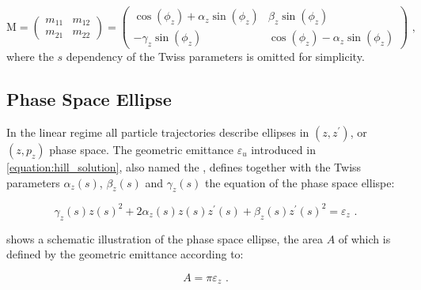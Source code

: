 \begin{equation}
    \mathrm{M} = 
    \left( 
    \begin{array}{ll}
        m_{11} & m_{12} \\
        m_{21} & m_{22}
    \end{array} \right) 
    = 
    \left(
    \begin{array}{cc}
        \cos \left( \phi_z \right) + \alpha_z \sin \left( \phi_z \right) & \beta_z \sin \left( \phi_z \right) \\
        - \gamma_z \sin \left( \phi_z \right)                            & \cos \left( \phi_z \right) - \alpha_z \sin \left( \phi_z \right)
    \end{array} 
    \right) \text{ ,}
    \label{equation:transfer_matrix_twiss_parameters}
\end{equation}
where the \(s\) dependency of the Twiss parameters is omitted for simplicity.

\subsection{Phase Space Ellipse}
\label{subsection:phase_space_ellipse}

In the linear regime all particle trajectories describe ellipses in \((z, z^{\prime})\), or \((z, p_z)\) phase space.
The geometric emittance \(\varepsilon_u\) introduced in \cref{equation:hill_solution}, also named the , defines together with the Twiss parameters \(\alpha_z(s)\), \(\beta_z(s)\) and \(\gamma_z(s)\) the equation of the phase space ellispe:

\begin{equation}
    \gamma_z(s) z(s)^{2} + 2 \alpha_z(s) z(s) z^{\prime}(s) + \beta_z(s) z^{\prime}(s)^{2} = \varepsilon_z \text{ .}
    \label{equation:ellipse_equation}
\end{equation}

 shows a schematic illustration of the phase space ellipse, the area \(A\) of which is defined by the geometric emittance according to:

\begin{equation}
    A = \pi \varepsilon_z \text{ .}
    \label{equation:phase_space_ellipse_area}
\end{equation}

